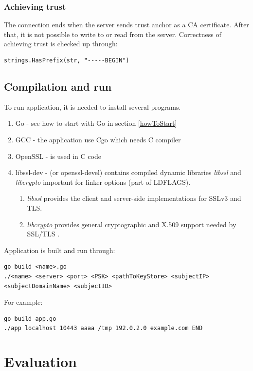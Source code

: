 \documentclass[
  twoside, 12pt, 
  printed, %
  notable,   %
  lof,     %
  lot,     %
]{fithesis3}
\begin{document}
\subsection{Achieving trust}
The connection ends when the server sends trust anchor as a CA certificate. After that, it is not 
possible to write to or read from the server. Correctness of achieving trust is checked up 
through:
\begin{lstlisting}
strings.HasPrefix(str, "-----BEGIN")
\end{lstlisting}

\section{Compilation and run}
To run application, it is needed to install several programs.
\begin{enumerate}
\item Go - see how to start with Go in section \ref{howToStart}
\item GCC - the application use Cgo which needs C compiler
\item OpenSSL - is used in C code
\item libssl-dev - (or openssl-devel) contains compiled dynamic libraries \textit{libssl} and \textit{libcrypto} important for linker options (part of LDFLAGS). 
\begin{enumerate}
  \item \textit{libssl} provides the client and server-side implementations for SSLv3 and TLS.
  \item \textit{libcrypto} provides general cryptographic and X.509 support needed by SSL/TLS \cite{opensslgit}.
\end{enumerate}
\end{enumerate}

Application is built and run through:
\begin{lstlisting}
go build <name>.go
./<name> <server> <port> <PSK> <pathToKeyStore> <subjectIP> <subjectDomainName> <subjectID>
\end{lstlisting}

For example:
\begin{lstlisting}
go build app.go
./app localhost 10443 aaaa /tmp 192.0.2.0 example.com END
\end{lstlisting}

\nocite{linux-man}
\nocite{foundation}

\chapter{Evaluation}
\end{document}
